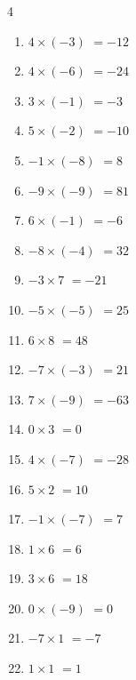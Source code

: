 \begin{multicols}{4}
\begin{enumerate}
  \item $4\times (-3)$
        $=-12$

  \item $4\times (-6)$
        $=-24$

  \item $3\times (-1)$
        $=-3$

  \item $5\times (-2)$
        $=-10$

  \item $-1\times (-8)$
        $=8$

  \item $-9\times (-9)$
        $=81$

  \item $6\times (-1)$
        $=-6$

  \item $-8\times (-4)$
        $=32$

  \item $-3\times 7$
        $=-21$

  \item $-5\times (-5)$
        $=25$

  \item $6\times 8$
        $=48$

  \item $-7\times (-3)$
        $=21$

  \item $7\times (-9)$
        $=-63$

\columnbreak %

\resetques

  \item $0\times 3$
        $=0$

  \item $4\times (-7)$
        $=-28$

  \item $5\times 2$
        $=10$

  \item $-1\times (-7)$
        $=7$

  \item $1\times 6$
        $=6$

  \item $3\times 6$
        $=18$

  \item $0\times (-9)$
        $=0$

  \item $-7\times 1$
        $=-7$

  \item $1\times 1$
        $=1$


\end{enumerate}
\end{multicols}
